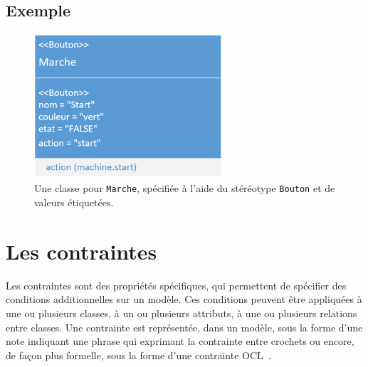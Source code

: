 
\subsection*{Exemple}
%
\begin{figure}[H]
    \begin{center}
    \includegraphics[width=7cm]{10_img/chap4/start.PNG}
    \caption[Une classe pour \texttt{Marche}, spécifiée à l'aide du stéréotype \texttt{Bouton}.]{Une classe pour \texttt{Marche}, spécifiée à l'aide du stéréotype \texttt{Bouton} et de valeurs \'etiquet\'ees.}
    \label{fig.uml_marche}
    \end{center}
\end{figure}






\section{Les contraintes}
Les contraintes sont des propriétés spécifiques, qui permettent de sp\'ecifier des conditions additionnelles sur un modèle.
Ces conditions peuvent être appliquées à une ou plusieurs classes, à un ou plusieurs attributs, à une ou plusieurs relations entre classes.
Une contrainte est représent\'ee, dans un modèle, sous la forme d'une note indiquant une phrase qui exprimant la contrainte entre crochets ou encore, de fa\c{c}on plus formelle, sous la forme d'une contrainte OCL~\cite{OCL}.

